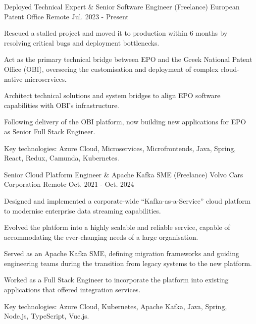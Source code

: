 

\begin{cventries}

  \cventry
    {Deployed Technical Expert \& Senior Software Engineer (Freelance)} %
    {European Patent Office} %
    {Remote} %
    {Jul. 2023 - Present} %
    {
      \begin{cvitems} %
        \item {Rescued a stalled project and moved it to production within 6 months by resolving critical bugs and deployment bottlenecks.}
        \item {Act as the primary technical bridge between EPO and the Greek National Patent Office (OBI), overseeing the customisation and deployment of complex cloud-native microservices.}
        \item {Architect technical solutions and system bridges to align EPO software capabilities with OBI's infrastructure.}
        \item {Following delivery of the OBI platform, now building new applications for EPO as Senior Full Stack Engineer.}
        \item {Key technologies: Azure Cloud, Microservices, Microfrontends, Java, Spring, React, Redux, Camunda, Kubernetes.}
      \end{cvitems}
    }

  \cventry
    {Senior Cloud Platform Engineer \& Apache Kafka SME (Freelance)} %
    {Volvo Cars Corporation} %
    {Remote} %
    {Oct. 2021 - Oct. 2024} %
    {
      \begin{cvitems} %
        \item {Designed and implemented a corporate-wide ``Kafka-as-a-Service'' cloud platform to modernise enterprise data streaming capabilities.}
        \item {Evolved the platform into a highly scalable and reliable service, capable of accommodating the ever-changing needs of a large organisation.}
        \item {Served as an Apache Kafka SME, defining migration frameworks and guiding engineering teams during the transition from legacy systems to the new platform.}
        \item {Worked as a Full Stack Engineer to incorporate the platform into existing applications that offered integration services.}
        \item {Key technologies: Azure Cloud, Kubernetes, Apache Kafka, Java, Spring, Node.js, TypeScript, Vue.js.}
      \end{cvitems}
    }


\end{cventries}
